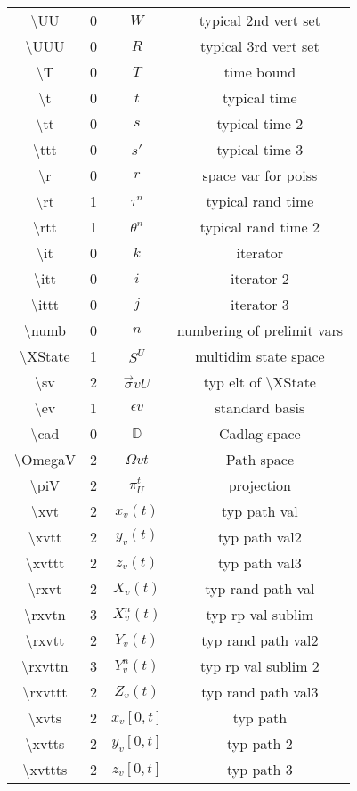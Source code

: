 \documentclass[12pt]{article}
\newcommand{\mb}{\mathbb}
\newcommand{\ep}{\epsilon}
\newcommand{\tbs}{\textbackslash}
\newcommand{\cad}{\mb{D}}							%
\renewcommand{\v}{v}							%
\renewcommand{\U}{U}							%
\newcommand{\UU}{W}								%
\newcommand{\UUU}{R}							%
\renewcommand{\S}{S}							%
\newcommand{\s}{\sigma}							%
\newcommand{\sv}{\vec{\s}}						%
\newcommand{\ev}{\ep}							%
\newcommand{\T}{T}								%
\renewcommand{\t}{t}							%
\renewcommand{\tt}{s}								%
\newcommand{\ttt}{s'}								%
\renewcommand{\r}{r}								%
\newcommand{\rt}[1]{\tau^{#1}}						%
\newcommand{\rtt}[1]{\theta^{#1}}					%
\renewcommand{\it}{k}								%
\newcommand{\itt}{i}								%
\newcommand{\ittt}{j}								%
\newcommand{\numb}{n}								%
\newcommand{\XState}[1]{\S^{#1}}				%
\newcommand{\piV}[2]{\pi_{#1}^{#2}}					%
\newcommand{\xvt}[2]{x_{#1}{(#2)}}					%
\newcommand{\xvtt}[2]{y_{#1}{(#2)}}					%
\newcommand{\xvttt}[2]{z_{#1}{(#2)}}				%
\newcommand{\rxvt}[2]{X_{#1}{(#2)}}					%
\newcommand{\rxvtn}[3]{X_{#1}^{#3}(#2)}				%
\newcommand{\rxvtt}[2]{Y_{#1}{(#2)}}				%
\newcommand{\rxvttn}[3]{Y_{#1}^{#3}(#2)}			%
\newcommand{\rxvttt}[2]{Z_{#1}{(#2)}}				%
\newcommand{\xvts}[2]{x_{#1}{#2}}					%
\newcommand{\xvtts}[2]{y_{#1}{#2}}					%
\newcommand{\xvttts}[2]{z_{#1}{#2}}					%
\begin{document}
\begin{longtable}{c|c|c|c}
\tbs UU&0&\(\UU\)								&typical 2nd vert set\\
\tbs UUU&0&\(\UUU\)								&typical 3rd vert set\\
\tbs T&0&\(\T\)									&time bound\\
\tbs t&0&\(\t\)								&typical time\\
\tbs tt&0&\(\tt\)								&typical time 2\\
\tbs ttt&0&\(\ttt\)							&typical time 3\\
\tbs r&0&\(\r\)								&space var for poiss\\
\tbs rt&1&\(\rt{\numb}\)					&typical rand time\\
\tbs rtt&1&\(\rtt{\numb}\)					&typical rand time 2\\
\tbs it&0& \(\it\)							&iterator\\
\tbs itt&0&\(\itt\)							&iterator 2\\
\tbs ittt&0&\(\ittt\)						&iterator 3\\
\tbs numb&0&\(\numb\)						&numbering of prelimit vars\\
\tbs XState&1&\(\XState{\U}\)				&multidim state space\\
\tbs sv&2&\(\sv{\v}{\U}\)					&typ elt of \tbs XState\\
\tbs ev&1&\(\ev{\v}\)						&standard basis\\
\tbs cad&0&\(\cad\)							&Cadlag space\\
\tbs OmegaV&2&\(\Omega{\v}{\t}\)			&Path space\\
\tbs piV&2&\(\piV{\U}{t}\)					&projection\\
\tbs xvt&2&\(\xvt{\v}{\t}\)					&typ path val\\
\tbs xvtt&2&\(\xvtt{\v}{\t}\)					&typ path val2\\
\tbs xvttt&2&\(\xvttt{\v}{\t}\)				&typ path val3\\
\tbs rxvt&2&\(\rxvt{\v}{\t}\)					&typ rand path val\\
\tbs rxvtn&3&\(\rxvtn{\v}{\t}{\numb}\)		&typ rp val sublim\\
\tbs rxvtt&2&\(\rxvtt{\v}{\t}\)				&typ rand path val2\\
\tbs rxvttn&3&\(\rxvttn{\v}{\t}{\numb}\)		&typ rp val sublim 2\\
\tbs rxvttt&2&\(\rxvttt{\v}{\t}\)				&typ rand path val3\\
\tbs xvts&2&\(\xvts{\v}{[0,\t]}\)					&typ path\\
\tbs xvtts&2&\(\xvtts{\v}{[0,\t]}\)					&typ path 2\\
\tbs xvttts&2&\(\xvttts{\v}{[0,\t]}\)					&typ path 3\\

\end{longtable}
\end{document}
